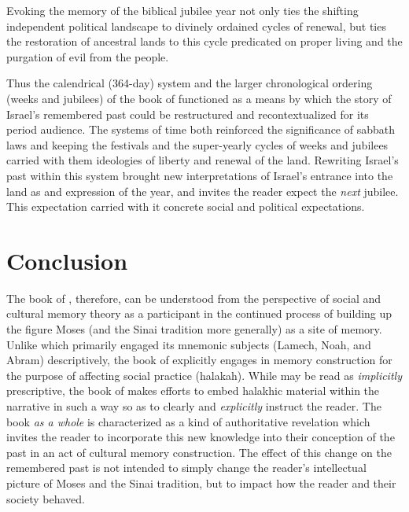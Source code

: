 
\noindent
Evoking the memory of the biblical jubilee year not only ties the shifting independent political landscape to divinely ordained cycles of renewal, but ties the restoration of ancestral lands to this cycle predicated on proper living and the purgation of evil from the people. 

Thus the calendrical (364-day) system and the larger chronological ordering (weeks and jubilees) of the book of \jub functioned as a means by which the story of Israel's remembered past could be restructured and recontextualized for its \secondtemple period audience. The systems of time both reinforced the significance of sabbath laws and keeping the festivals and the super-yearly cycles of weeks and jubilees carried with them ideologies of liberty and renewal of the land. Rewriting Israel's past within this system brought new interpretations of Israel's entrance into the land as and expression of the \jub year, and invites the reader expect the \emph{next} jubilee. This expectation carried with it concrete social and political expectations.

\section{Conclusion}

The book of \jub, therefore, can be understood from the perspective of social and cultural memory theory as a participant in the continued process of building up the figure Moses (and the Sinai tradition more generally) as a site of memory. Unlike \ga which primarily engaged its mnemonic subjects (Lamech, Noah, and Abram) descriptively, the book of \jub explicitly engages in memory construction for the purpose of affecting social practice (halakah). While \ga may be read as \emph{implicitly} prescriptive, the book of \jub makes efforts to embed halakhic material within the narrative in such a way so as to clearly and \emph{explicitly} instruct the reader. The book \emph{as a whole} is characterized as a kind of authoritative revelation which invites the reader to incorporate this new knowledge into their conception of the past in an act of cultural memory construction. The effect of this change on the remembered past is not intended to simply change the reader's intellectual picture of Moses and the Sinai tradition, but to impact how the reader and their society behaved.

